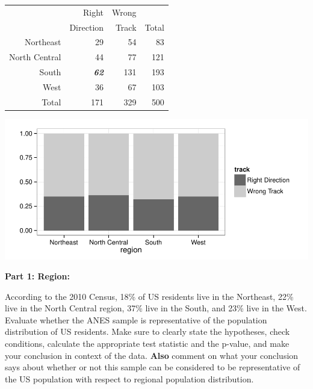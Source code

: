 \documentclass[11pt]{article}
\begin{document}
\begin{minipage}[c]{0.4\textwidth}
\begin{center}
\begin{tabular}{rrr|r}
  \hline
 & Right  & Wrong  &  \\ 
 &  Direction &  Track & Total \\ 
  \hline
Northeast & 29 & 54 & 83 \\ 
  North Central & 44 & 77 & 121 \\ 
  South & \textit{\textbf{62}} & 131 & 193 \\ 
  West & 36 & 67 & 103 \\ 
\hline
  Total & 171 & 329 & 500 \\ 
   \hline
\end{tabular}
\end{center}
\end{minipage}
\begin{minipage}[c]{0.6\textwidth}
\begin{center}
\includegraphics[width=\textwidth]{figures/anes_mosaic.pdf}
\end{center}
\end{minipage}

\pagebreak

\textbf{Part 1: Region:} 

According to the 2010 Census, 18\% of US residents live in the Northeast, 22\% live in the North 
Central region, 37\% live in the South, and 23\% live in the West. Evaluate whether the ANES sample 
is representative of the population distribution of US residents. Make sure to clearly state the hypotheses, 
check conditions, calculate the appropriate test statistic and the p-value, and make your conclusion in context 
of the data. \textbf{Also} comment on what your conclusion says about whether or not this sample can be 
considered to be representative of the US population with respect to regional population distribution. \\
\end{document}
